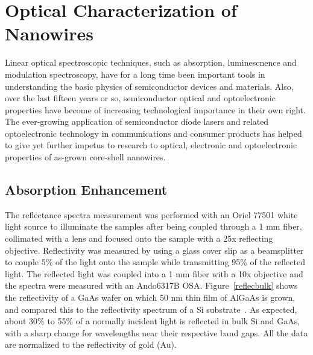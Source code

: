\section{Optical Characterization of Nanowires}

Linear optical spectroscopic techniques, such as absorption, luminescnence and
modulation spectroscopy, have for a long time been important tools in
understanding the basic physics of semiconductor devices and materials. Also,
over the last fifteen years or so, semiconductor optical and optoelectronic
properties have become of increasing technological importance in their own
right. The ever-growing application of semiconductor diode lasers and related
optoelectronic technology in communications and consumer products has helped to
give yet further impetus to research to optical, electronic and optoelectronic
properties of as-grown core-shell nanowires.

\subsection{Absorption Enhancement} \label{Data_Abs}

The reflectance spectra measurement was performed with an Oriel 77501 white
light source to illuminate the samples after being coupled through a 1 mm
fiber, collimated with a lens and focused onto the sample with a 25x reflecting
objective. Reflectivity was measured by using a glass cover slip as a
beamsplitter to couple 5\% of the light onto the sample while transmitting 95\%
of the reflected light. The reflected light was coupled into a 1 mm fiber with
a 10x objective and the spectra were measured with an Ando6317B OSA.
Figure~\ref{reflecbulk} shows the reflectivity of a GaAs wafer on which 50 nm
thin film of AlGaAs is grown, and compared this to the reflectivity spectrum of
a Si substrate~\cite{Wang:2013ux}. As expected, about 30\% to 55\% of a
normally incident light is reflected in bulk Si and GaAs, with a sharp change
for wavelengths near their respective band gaps. All the data are normalized to
the reflectivity of gold (Au).

